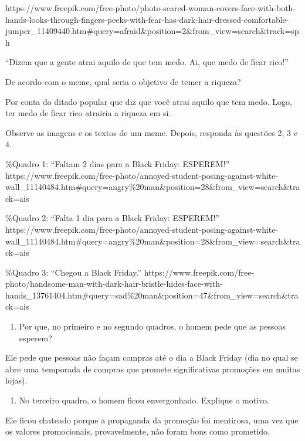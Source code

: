 \begin{itemize}
\begin{itemize}
{\begin{itemize}
\begin{itemize}
https://www.freepik.com/free-photo/photo-scared-woman-covers-face-with-both-hands-looks-through-fingers-peeks-with-fear-has-dark-hair-dressed-comfortable-jumper\_11409440.htm\#query=afraid\&position=2\&from\_view=search\&track=sph

``Dizem que a gente atrai aquilo de que tem medo. Ai, que medo de ficar
rico!''

De acordo com o meme, qual seria o objetivo de temer a riqueza?


Por conta do ditado popular que diz que você atrai aquilo que tem medo.
Logo, ter medo de ficar rico atrairia a riqueza em si.

Observe as imagens e os textos de um meme. Depois, responda às questões
2, 3 e 4.

\%Quadro 1: ``Faltam 2 dias para a Black Friday: ESPEREM!''
https://www.freepik.com/free-photo/annoyed-student-posing-against-white-wall\_11140484.htm\#query=angry\%20man\&position=28\&from\_view=search\&track=ais

\%Quadro 2: ``Falta 1 dia para a Black Friday: ESPEREM!''
https://www.freepik.com/free-photo/annoyed-student-posing-against-white-wall\_11140484.htm\#query=angry\%20man\&position=28\&from\_view=search\&track=ais

\%Quadro 3: ``Chegou a Black Friday.''
https://www.freepik.com/free-photo/handsome-man-with-dark-hair-bristle-hides-face-with-hands\_13761404.htm\#query=sad\%20man\&position=47\&from\_view=search\&track=ais

\begin{enumerate}
\def\labelenumi{\arabic{enumi}.}
\setcounter{enumi}{1}
\tightlist
\item
  Por que, no primeiro e no segundo quadros, o homem pede que as pessoas
  esperem?
\end{enumerate}


Ele pede que pessoas não façam compras até o dia a Black Friday (dia no
qual se abre uma temporada de compras que promete significativas
promoções em muitas lojas).

\begin{enumerate}
\def\labelenumi{\arabic{enumi}.}
\setcounter{enumi}{2}
\tightlist
\item
  No terceiro quadro, o homem ficou envergonhado. Explique o motivo.
\end{enumerate}


Ele ficou chateado porque a propaganda da promoção foi mentirosa, uma
vez que os valores promocionais, provavelmente, não foram bons como
prometido.


\end{itemize}
\end{itemize}}
\end{itemize}
\end{itemize}
